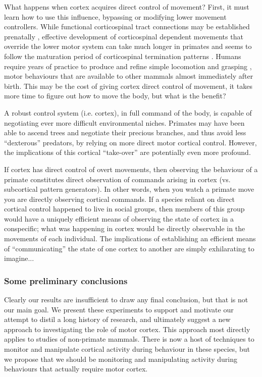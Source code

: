 What happens when cortex acquires direct control of movement? First, it must learn how to use this influence, bypassing or modifying lower movement controllers. While functional corticospinal tract connections may be established prenatally \cite{Eyre2000}, effective development of corticospinal dependent movements that override the lower motor system can take much longer in primates and seems to follow the maturation period of corticospinal termination patterns \cite{Lawrence1976}. Humans require years of practice to produce and refine simple locomotion and grasping \cite{Thelen1985,VonHofsten1989}, motor behaviours that are available to other mammals almost immediately after birth. This may be the cost of giving cortex direct control of movement, it takes more time to figure out how to move the body, but what is the benefit? 

A robust control system (i.e. cortex), in full command of the body, is capable of negotiating ever more difficult environmental niches. Primates may have been able to ascend trees and negotiate their precious branches, and thus avoid less ``dexterous'' predators, by relying on more direct motor cortical control. However, the implications of this cortical ``take-over'' are potentially even more profound. 

If cortex has direct control of overt movements, then observing the behaviour of a primate constitutes direct observation of commands arising in cortex (vs. subcortical pattern generators). In other words, when you watch a primate move you are directly observing cortical commands. If a species reliant on direct cortical control happened to live in social groups, then members of this group would have a uniquely efficient means of observing the state of cortex in a conspecific; what was happening in cortex would be directly observable in the movements of each individual. The implications of establishing an efficient means of ``communicating'' the state of one cortex to another are simply exhilarating to imagine...

\subsubsection*{Some preliminary conclusions}

Clearly our results are insufficient to draw any final conclusion, but that is not our main goal. We present these experiments to support and motivate our attempt to distil a long history of research, and ultimately suggest a new approach to investigating the role of motor cortex. This approach most directly applies to studies of non-primate mammals. There is now a host of techniques to monitor and manipulate cortical activity during behaviour in these species, but we propose that we should be monitoring and manipulating activity during behaviours that actually require motor cortex.


